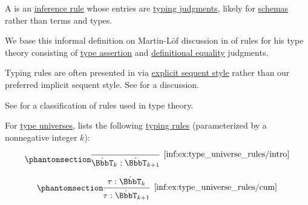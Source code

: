 \begin{concept}\label{con:typing_rule}
  A  is an \hyperref[def:inference_rule]{inference rule} whose entries are \hyperref[rem:typing_judgments]{typing judgments}, likely for \hyperref[con:schemas_and_instances]{schemas} rather than terms and types.
\end{concept}
\begin{comments}
  \item We base this informal definition on Martin-L\"of discussion in \cite{MartinLöf1984IntuitionisticTypeTheory} of rules for his type theory consisting of \hyperref[def:type_assertion]{type assertion} and \hyperref[con:equality]{definitional equality} judgments.

  \item Typing rules are often presented in via \hyperref[rem:natural_deduction_explicit_sequents]{explicit sequent style} rather than our preferred implicit sequent style. See  for a discussion.

  \item See  for a classification of rules used in type theory.
\end{comments}

\begin{example}\label{ex:type_universe_rules}
  For \hyperref[con:type_universe]{type universes}, \cite[\S A.2.3]{UnivalentFoundationsProgram2024OctoberHoTT} lists the following \hyperref[con:typing_rule]{typing rules} (parameterized by a nonnegative integer \( k \)):
  \begin{paracol}{2}
    \begin{leftcolumn}
      \begin{equation*}\taglabel[\ensuremath{ \BbbT_+ }]{inf:ex:type_universe_rules/intro}
        \begin{prooftree}
          \infer0[\ref{inf:ex:type_universe_rules/intro}]{ \syn\BbbT_k: \syn\BbbT_{k+1} }
        \end{prooftree}
      \end{equation*}
    \end{leftcolumn}

    \begin{rightcolumn}
      \begin{equation*}\taglabel[\ensuremath{ \BbbT_{\logic{cum}} }]{inf:ex:type_universe_rules/cum}
        \begin{prooftree}
          \hypo{ \tau: \syn\BbbT_k }
          \infer1[\ref{inf:ex:type_universe_rules/cum}]{ \tau: \syn\BbbT_{k+1} }
        \end{prooftree}
      \end{equation*}
    \end{rightcolumn}
  \end{paracol}
\end{example}

